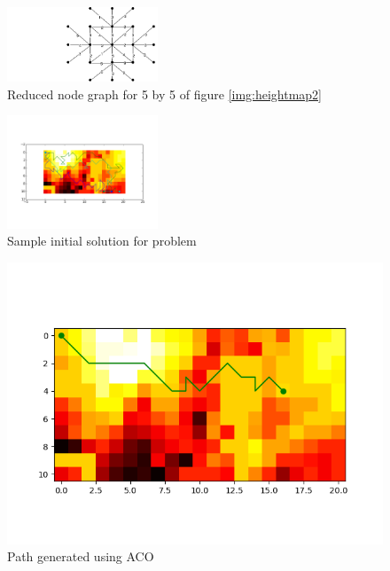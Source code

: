 \documentclass[conference]{IEEEtran}
\begin{document}
\begin{figure}[H]
\centerline{\includegraphics[width=0.4\textwidth]{images/nodegraph5.png}}
\caption{Reduced node graph for 5 by 5 of figure \ref{img:heightmap2}}
\label{img:nodegraph5}
\end{figure}

\begin{figure}[H]
\centerline{\includegraphics[width=0.4\textwidth]{images/solution_aco.png}}
\caption{Sample initial solution for problem}
\label{img:solution_aco}
\end{figure}

\begin{figure}[H]
\centerline{\includegraphics[scale=0.5]{performance/aco_1_drone}}
\caption{Path generated using ACO}
\label{img:path_aco_1_drone}
\end{figure}
\end{document}
